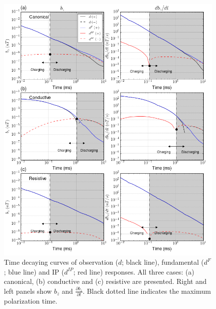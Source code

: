 \documentclass[a4paper, 11pt]{article}
\newcommand{\dip}{d^{IP}}
\begin{document}
\begin{figure}[htb]
  \centering
  \includegraphics[width=1.\textwidth]{figures/Three_IPresp.png}
  \caption{Time decaying curves of observation ($d$; black line), fundamental ($d^F$; blue line) and IP ($\dip$; red line) responses. All three cases: (a) canonical, (b) conductive and (c) resistive are presented. Right and left panels show $b_z$ and $\frac{\partial b_z}{\partial t}$. Black dotted line indicates the maximum polarization time.}
  \label{F:Three_IPresp}
\end{figure}
\end{document}
